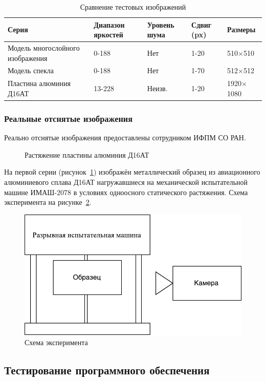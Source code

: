 \begin{longtable}[h!]{|m{}|m{}|m{}|m{}|m{}|}
\caption{Сравнение тестовых изображений}
\label{tab:set_image}
\\ \hline
Серия & Диапазон яркостей 	& Уровень шума & Сдвиг (px) &  Размеры \\ \hline
Модель многослойного изображения & 0-188 & Нет & 1-20 &  510$\times$510 \\ \hline
Модель спекла & 0-188 & Нет & 1-70 &  512$\times$512 \\ \hline
Пластина алюминия Д16АТ & 13-228 & Неизв. & 1-20 &  1920$\times$1080\\ \hline
\end{longtable}
\subsubsection{Реальные отснятые изображения}

Реально отснятые изображения предоставлены сотрудником ИФПМ СО РАН. 
\begin{figure}[ht!]
\caption{Растяжение пластины алюминия Д16АТ}
\label{pic:al_deform}
\end{figure}
На первой серии (рисунок~\ref{pic:al_deform}) изображён металлический образец из авиационного алюминиевого сплава Д16АТ нагружавшиеся на механической испытательной машине ИМАШ-2078 в условиях одноосного статического растяжения. Схема эксперимента на рисунке~\ref{fig:gap_mach}.
\begin{figure}[ht!]
\centering
\includegraphics[width=0.7\linewidth]{images/gap_mach-crop.pdf}
\caption{Схема эксперимента}
\label{fig:gap_mach}
\end{figure}

\subsection{Тестирование программного обеспечения}
